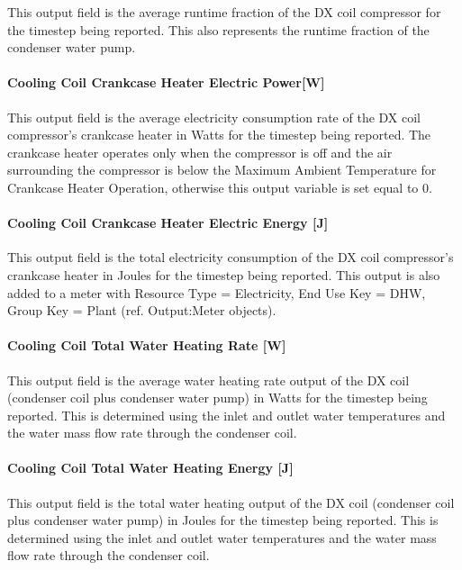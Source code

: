 This output field is the average runtime fraction of the DX coil compressor for the timestep being reported. This also represents the runtime fraction of the condenser water pump.

\paragraph{Cooling Coil Crankcase Heater Electric Power{[}W{]}}\label{cooling-coil-crankcase-heater-electric-powerw-1}

This output field is the average electricity consumption rate of the DX coil compressor's crankcase heater in Watts for the timestep being reported. The crankcase heater operates only when the compressor is off and the air surrounding the compressor is below the Maximum Ambient Temperature for Crankcase Heater Operation, otherwise this output variable is set equal to 0.

\paragraph{Cooling Coil Crankcase Heater Electric Energy {[}J{]}}\label{cooling-coil-crankcase-heater-electric-energy-j-2}

This output field is the total electricity consumption of the DX coil compressor's crankcase heater in Joules for the timestep being reported. This output is also added to a meter with Resource Type = Electricity, End Use Key = DHW, Group Key = Plant (ref. Output:Meter objects).

\paragraph{Cooling Coil Total Water Heating Rate {[}W{]}}\label{cooling-coil-total-water-heating-rate-w}

This output field is the average water heating rate output of the DX coil (condenser coil plus condenser water pump) in Watts for the timestep being reported. This is determined using the inlet and outlet water temperatures and the water mass flow rate through the condenser coil.

\paragraph{Cooling Coil Total Water Heating Energy {[}J{]}}\label{cooling-coil-total-water-heating-energy-j}

This output field is the total water heating output of the DX coil (condenser coil plus condenser water pump) in Joules for the timestep being reported. This is determined using the inlet and outlet water temperatures and the water mass flow rate through the condenser coil.

